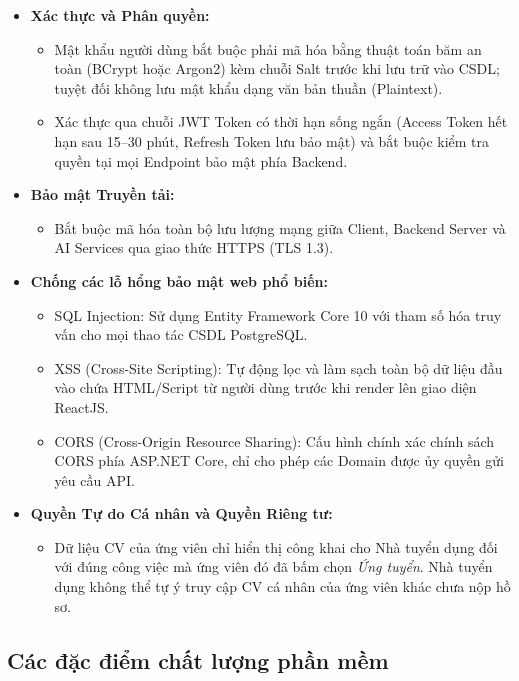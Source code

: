 \begin{itemize}
    \item \textbf{Xác thực và Phân quyền:}
    \begin{itemize}
        \item Mật khẩu người dùng bắt buộc phải mã hóa bằng thuật toán băm an toàn (BCrypt hoặc Argon2) kèm chuỗi Salt trước khi lưu trữ vào CSDL; tuyệt đối không lưu mật khẩu dạng văn bản thuần (Plaintext).
        \item Xác thực qua chuỗi JWT Token có thời hạn sống ngắn (Access Token hết hạn sau 15--30 phút, Refresh Token lưu bảo mật) và bắt buộc kiểm tra quyền tại mọi Endpoint bảo mật phía Backend.
    \end{itemize}

    \item \textbf{Bảo mật Truyền tải:}
    \begin{itemize}
        \item Bắt buộc mã hóa toàn bộ lưu lượng mạng giữa Client, Backend Server và AI Services qua giao thức HTTPS (TLS 1.3).
    \end{itemize}

    \item \textbf{Chống các lỗ hổng bảo mật web phổ biến:}
    \begin{itemize}
        \item SQL Injection: Sử dụng Entity Framework Core 10 với tham số hóa truy vấn cho mọi thao tác CSDL PostgreSQL.
        \item XSS (Cross-Site Scripting): Tự động lọc và làm sạch toàn bộ dữ liệu đầu vào chứa HTML/Script từ người dùng trước khi render lên giao diện ReactJS.
        \item CORS (Cross-Origin Resource Sharing): Cấu hình chính xác chính sách CORS phía ASP.NET Core, chỉ cho phép các Domain được ủy quyền gửi yêu cầu API.
    \end{itemize}

    \item \textbf{Quyền Tự do Cá nhân và Quyền Riêng tư:}
    \begin{itemize}
        \item Dữ liệu CV của ứng viên chỉ hiển thị công khai cho Nhà tuyển dụng đối với đúng công việc mà ứng viên đó đã bấm chọn \textit{Ứng tuyển}. Nhà tuyển dụng không thể tự ý truy cập CV cá nhân của ứng viên khác chưa nộp hồ sơ.
    \end{itemize}
\end{itemize}

\subsection{Các đặc điểm chất lượng phần mềm}

